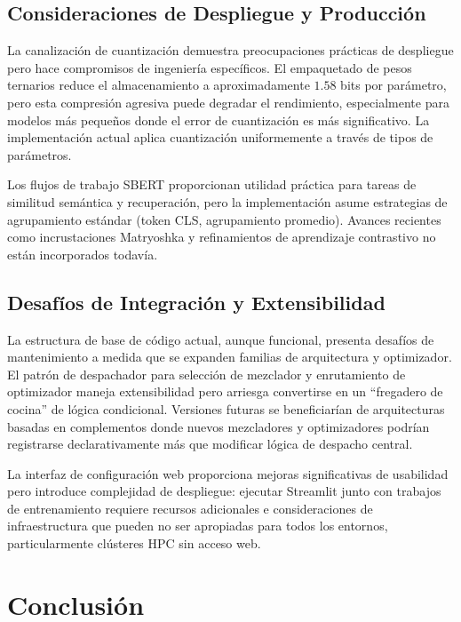 \documentclass[11pt,a4paper]{article}
\begin{document}
\subsection{Consideraciones de Despliegue y Producción}

La canalización de cuantización demuestra preocupaciones prácticas de despliegue pero hace compromisos de ingeniería específicos. El empaquetado de pesos ternarios reduce el almacenamiento a aproximadamente $1.58$ bits por parámetro, pero esta compresión agresiva puede degradar el rendimiento, especialmente para modelos más pequeños donde el error de cuantización es más significativo. La implementación actual aplica cuantización uniformemente a través de tipos de parámetros.

Los flujos de trabajo SBERT proporcionan utilidad práctica para tareas de similitud semántica y recuperación, pero la implementación asume estrategias de agrupamiento estándar (token CLS, agrupamiento promedio). Avances recientes como incrustaciones Matryoshka \citep{muennighoff_matryoshka_2021} y refinamientos de aprendizaje contrastivo \citep{chen_supervised_2020} no están incorporados todavía.

\subsection{Desafíos de Integración y Extensibilidad}

La estructura de base de código actual, aunque funcional, presenta desafíos de mantenimiento a medida que se expanden familias de arquitectura y optimizador. El patrón de despachador para selección de mezclador y enrutamiento de optimizador maneja extensibilidad pero arriesga convertirse en un ``fregadero de cocina'' de lógica condicional. Versiones futuras se beneficiarían de arquitecturas basadas en complementos donde nuevos mezcladores y optimizadores podrían registrarse declarativamente más que modificar lógica de despacho central.

La interfaz de configuración web proporciona mejoras significativas de usabilidad pero introduce complejidad de despliegue: ejecutar Streamlit junto con trabajos de entrenamiento requiere recursos adicionales e consideraciones de infraestructura que pueden no ser apropiadas para todos los entornos, particularmente clústeres HPC sin acceso web.

\section{Conclusión}
\label{sec:conclusion}
\end{document}
